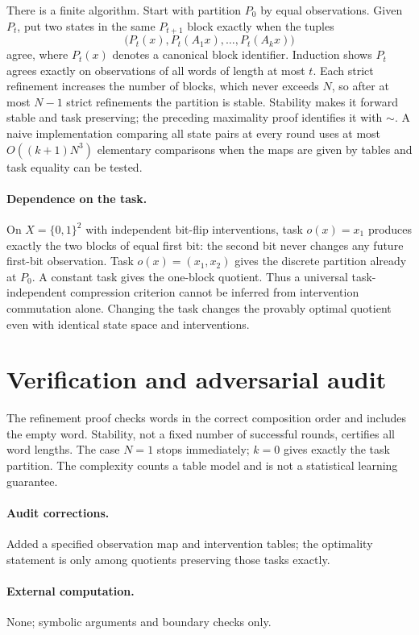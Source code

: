 \documentclass[11pt]{article}
\begin{document}
There is a finite algorithm. Start with partition $P_0$ by equal observations. Given $P_t$, put two states in the same $P_{t+1}$ block exactly when the tuples
\[
\bigl(P_t(x),P_t(A_1x),\ldots,P_t(A_kx)\bigr)
\]
agree, where $P_t(x)$ denotes a canonical block identifier. Induction shows $P_t$ agrees exactly on observations of all words of length at most $t$. Each strict refinement increases the number of blocks, which never exceeds $N$, so after at most $N-1$ strict refinements the partition is stable. Stability makes it forward stable and task preserving; the preceding maximality proof identifies it with $\sim$. A naive implementation comparing all state pairs at every round uses at most $O((k+1)N^3)$ elementary comparisons when the maps are given by tables and task equality can be tested.

\paragraph{Dependence on the task.}
On $X=\{0,1\}^2$ with independent bit-flip interventions, task $o(x)=x_1$ produces exactly the two blocks of equal first bit: the second bit never changes any future first-bit observation. Task $o(x)=(x_1,x_2)$ gives the discrete partition already at $P_0$. A constant task gives the one-block quotient. Thus a universal task-independent compression criterion cannot be inferred from intervention commutation alone. Changing the task changes the provably optimal quotient even with identical state space and interventions.
\section{Verification and adversarial audit}
The refinement proof checks words in the correct composition order and includes the empty word. Stability, not a fixed number of successful rounds, certifies all word lengths. The case $N=1$ stops immediately; $k=0$ gives exactly the task partition. The complexity counts a table model and is not a statistical learning guarantee.
\paragraph{Audit corrections.} Added a specified observation map and intervention tables; the optimality statement is only among quotients preserving those tasks exactly.
\paragraph{External computation.} None; symbolic arguments and boundary checks only.
\end{document}
